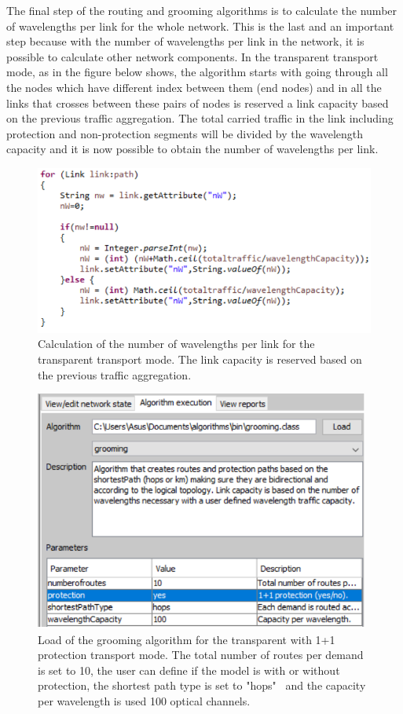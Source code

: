 \vspace{11pt}
The final step of the routing and grooming algorithms is to calculate the number of wavelengths per link for the whole network. This is the last and an important step because with the number of wavelengths per link in the network, it is possible to calculate other network components. In the transparent transport mode, as in the figure below shows, the algorithm starts with going through all the nodes which have different index between them (end nodes) and in all the links that crosses between these pairs of nodes is reserved a link capacity based on the previous traffic aggregation. The total carried traffic in the link including protection and non-protection segments will be divided by the wavelength capacity and it is now possible to obtain the number of wavelengths per link.

\begin{figure}[H]
\centering
\includegraphics[width=13cm]{sdf/heuristic/transparent_protection/figures/grooming_transparent_protec5}
\caption{Calculation of the number of wavelengths per link for the transparent transport mode. The link capacity is reserved based on the previous traffic aggregation.}
\label{grooming_transparent_protec5}
\end{figure}

\begin{figure}[H]
\centering
\includegraphics[width=11cm]{sdf/heuristic/transparent_protection/figures/grooming_transparent_protec6}
\caption{Load of the grooming algorithm for the transparent with 1+1 protection transport mode. The total number of routes per demand is set to 10, the user can define if the model is with or without protection, the shortest path type is set to "hops" \ and the capacity per wavelength is used 100 optical channels.}
\label{grooming_transparent_protec6}
\end{figure}

